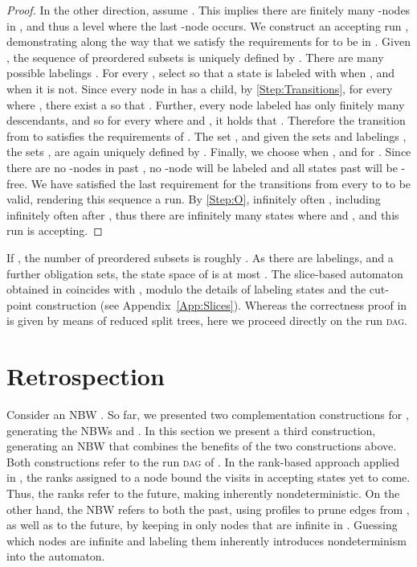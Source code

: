 \documentclass{LMCS}
\newcommand{\DAG}{\textsc{dag}\xspace}
\begin{document}
\begin{proof}
In the other direction, assume . This implies there are finitely many -nodes in
, and thus a level  where the last -node occurs.  We construct an accepting run
, demonstrating along the way that we satisfy the requirements for
 to be in . Given , the sequence
 of preordered subsets  is uniquely defined by
.  There are many possible labelings . For every , select  so that a
state  is labeled with  when , and  when it is
not. Since every node in  has a child, by \ref{Step:Transitions}, for every 
where , there exist a  so that
.  Further, every node labeled  has only finitely many descendants, and
so for every  where  and , it holds
that .  Therefore the transition from  to  satisfies
the requirements of . The set , and given the sets  and labelings
, the sets ,  are again uniquely defined by .  Finally, we
choose  when , and  for .  Since there are no -nodes in 
past , no -node will be labeled  and all states past  will be -free. We have
satisfied the last requirement for the transitions from every  to  to be
valid, rendering this sequence a run. By \ref{Step:O}, infinitely often , including
infinitely often after , thus there are infinitely many states  where  and
, and this run is accepting.
\cbend
\end{proof} 

If , the number of preordered subsets is roughly  \cite{Var80}. As there
are  labelings, and a further  obligation sets, the state space of  is at most
.  The slice-based automaton obtained in \cite{KW08} coincides with , modulo the
details of labeling states and the cut-point construction (see
Appendix~\ref{App:Slices}). Whereas the correctness proof in \cite{KW08} is given by means of
reduced split trees, here we proceed directly on the run \DAG.

\section{Retrospection}\label{Slices_To_Ranks}

Consider an NBW . So far, we presented two complementation constructions for , generating
the NBWs  and . In this section we present a third
construction, generating an NBW that combines the benefits of the two constructions above.  Both
constructions refer to the run \DAG of .  In the rank-based approach applied in , the
ranks assigned to a node bound the visits in accepting states yet to come. Thus, the ranks refer to
the future, making  inherently nondeterministic.  On the other hand, the NBW   refers
to both the past, using profiles to prune edges from , as well as to the future, by keeping in
 only nodes that are infinite in . Guessing which nodes are infinite and
labeling them  inherently introduces nondeterminism into the automaton.
\end{document}
